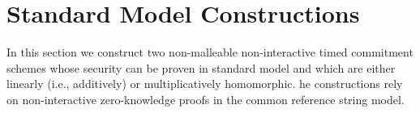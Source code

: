 \section{Standard Model Constructions}
In this section we construct two non-malleable non-interactive timed commitment schemes whose security can be proven in standard model and which are either linearly (i.e., additively) or multiplicatively homomorphic.  he constructions rely on non-interactive zero-knowledge proofs in the common reference string model. 







